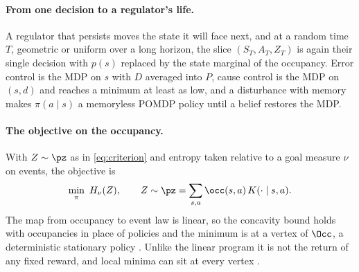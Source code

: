 \paragraph{From one decision to a regulator's life.}
A regulator that persists moves the state it will face next, and at a random time $T$, geometric or uniform over a long horizon, the slice $(S_T, A_T, Z_T)$ is again their single decision with $p(s)$ replaced by the state marginal of the occupancy.
Error control is the MDP on $s$ with $D$ averaged into $P$, cause control is the MDP on $(s,d)$ and reaches a minimum at least as low, and a disturbance with memory makes $\pi(a \mid s)$ a memoryless POMDP policy \citep{Singh-learning94} until a belief restores the MDP.

\paragraph{The objective on the occupancy.}
With $Z \sim \pz$ as in \eqref{eq:criterion} and entropy taken relative to a goal measure $\nu$ on events, the objective is
\begin{equation}
  \min_{\pi}\ H_\nu(Z), \qquad Z \sim \pz = \sum_{s,a} \occ(s,a)\, K(\cdot \mid s,a).
  \label{eq:objective}
\end{equation}
The map from occupancy to event law is linear, so the concavity bound holds with occupancies in place of policies and the minimum is at a vertex of $\Occ$, a deterministic stationary policy \citep{Derman-finite70ch7,Piunovskiy-controlled98}.
Unlike the linear program it is not the return of any fixed reward, and local minima can sit at every vertex \citep{Pardalos-quadratic91}.

